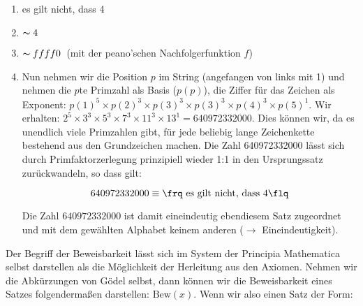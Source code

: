 \begin{enumerate}
	\item \frq es gilt nicht, dass 4\flq
	\item \frq$\thicksim 4$\flq
	\item \frq$\thicksim ffff0$\flq\ (mit der peano'schen Nachfolgerfunktion $f$)
	\item Nun nehmen wir die Position $p$ im String (angefangen von links mit 1)
		und nehmen die $p$te Primzahl als Basis ($p(p)$), die Ziffer für das Zeichen
		als Exponent: $p(1)^5 \times p(2)^3 \times p(3)^3 \times p(3)^3 \times p(4)^3 \times p(5)^1$.
		Wir erhalten:
		$2^5 \times 3^3 \times 5^3 \times 7^3 \times 11^3 \times 13^1 = 640972332000$. Dies
		können wir, da es unendlich viele Primzahlen gibt, für
		jede beliebig lange Zeichenkette
		bestehend aus den Grundzeichen machen. Die Zahl 640972332000 lässt sich durch
		Primfaktorzerlegung prinzipiell wieder 1:1 in den Ursprungssatz zurückwandeln, so dass gilt:

		$$ 640972332000 \equiv \text{\frq es gilt nicht, dass 4\flq} $$

		Die Zahl $640972332000$ ist damit eineindeutig ebendiesem Satz zugeordnet und mit dem
		gewählten Alphabet keinem anderen ($\longrightarrow$ Eineindeutigkeit).
\end{enumerate}

Der Begriff der Beweisbarkeit
lässt sich im System der Principia Mathematica selbst
darstellen als die Möglichkeit der Herleitung aus den Axiomen. Nehmen wir die Abkürzungen
von Gödel selbst, dann können wir die Beweisbarkeit eines Satzes folgendermaßen
darstellen: $\text{Bew}\left(x\right)$.
Wenn wir also einen Satz der Form:

